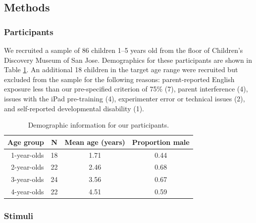 \documentclass[man,noapacite]{apa2}
\begin{document}
\subsection{Methods}

\subsubsection{Participants}                                                                                                                              


We recruited a sample of 86 children 1--5 years old from the floor of Children's Discovery Museum of San Jose. Demographics for these participants are shown in Table \ref{tab:demo}. An additional 18 children in the target age range were recruited but excluded from the sample for the following reasons: parent-reported English exposure less than our pre-specified criterion of 75\% (7), parent interference (4), issues with the iPad pre-training (4), experimenter error or technical issues (2), and self-reported developmental disability (1). 

\begin{table}[t]
\centering
\caption{\label{tab:demo} Demographic information for our participants.}
\begin{tabular}{rccc}
  \hline
Age group & N & Mean age (years) & Proportion male \\ 
  \hline
1-year-olds &  18 & 1.71 & 0.44 \\ 
2-year-olds &  22 & 2.46 & 0.68 \\ 
3-year-olds &  24 & 3.56 & 0.67 \\ 
4-year-olds &  22 & 4.51 & 0.59 \\ 
   \hline
\end{tabular}
\end{table}


\subsubsection{Stimuli}
\end{document}
